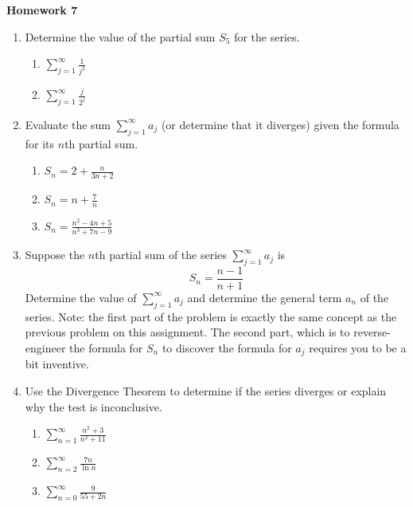 \documentclass{article}
\begin{document}
\begin{center}
    \large \textbf{Homework 7}
\end{center}
                \begin{enumerate}
                    \item Determine the value of the partial sum $S_5$ for the series.
                        \begin{enumerate}
                            \item $ \sum_{j=1}^\infty \frac{1}{j^2}$
                            \item $ \sum_{j=1}^\infty \frac{j}{2^j}$
                        \end{enumerate}
                    \item Evaluate the sum $ \sum_{j=1}^\infty a_j$ (or determine that it diverges) given the formula for its $n$th partial sum.
                        \begin{enumerate}
                            \item $ S_n = 2+\frac{n}{3n+2}$
                            \item $ S_n = n+\frac{7}{n}$
                            \item $ S_n = \frac{n^2-4n+5}{n^3+7n-9}$
                        \end{enumerate}
                    \item Suppose the $n$th partial sum of the series $ \sum_{j=1}^\infty a_j$ is $$S_n = \frac{n-1}{n+1}$$  Determine the value of $ \sum_{j=1}^\infty a_j$ and determine the general term $a_n$ of the series. Note: the first part of the problem is exactly the same concept as the previous problem on this assignment. The second part, which is to reverse-engineer the formula for $S_n$ to discover the formula for $a_j$ requires you to be a bit inventive. 
                    \item Use the Divergence Theorem to determine if the series diverges or explain why the test is inconclusive.  
                        \begin{enumerate}
                            \item $ \sum_{n=1}^\infty \frac{n^2+3}{n^2+11}$
                            \item $ \sum_{n=2}^\infty \frac{7n}{\ln n}$
                            \item $ \sum_{n=0}^\infty \frac{9}{55+2n}$
                        \end{enumerate}

\end{enumerate}
\end{document}
